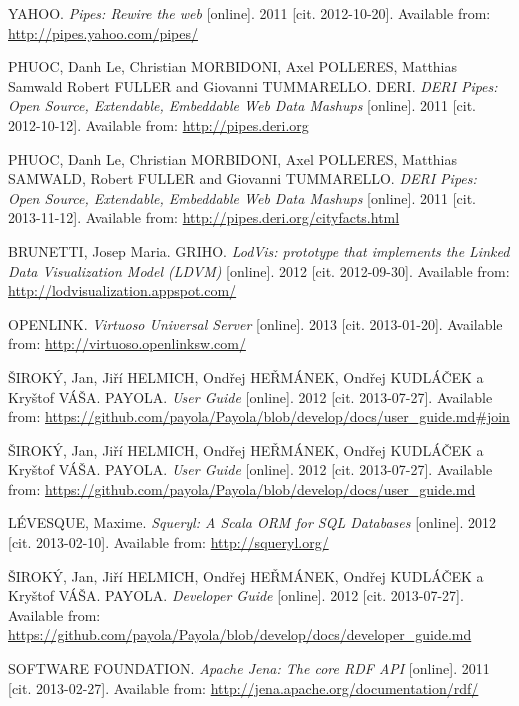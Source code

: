 \begin{thebibliography}{99}
{\sc YAHOO.}
\emph{Pipes: Rewire the web} [online]. 2011 [cit. 2012-10-20].
Available from: \url{http://pipes.yahoo.com/pipes/}

{\sc PHUOC,} Danh Le, Christian MORBIDONI, Axel POLLERES,
Matthias Samwald Robert FULLER and Giovanni TUMMARELLO. DERI.
\emph{DERI Pipes: Open Source, Extendable, Embeddable Web Data Mashups} [online].
2011 [cit. 2012-10-12]. 
Available from: \url{http://pipes.deri.org}

{\sc PHUOC,} Danh Le, Christian MORBIDONI, Axel POLLERES,
Matthias SAMWALD, Robert FULLER and Giovanni TUMMARELLO.
\emph{DERI Pipes: Open Source, Extendable, Embeddable Web Data Mashups} [online]. 2011
[cit. 2013-11-12].
Available from: \url{http://pipes.deri.org/cityfacts.html}

{\sc BRUNETTI,} Josep Maria. GRIHO.
\emph{LodVis: prototype that implements the Linked Data Visualization Model (LDVM)}
[online]. 2012 [cit. 2012-09-30].
Available from: \url{http://lodvisualization.appspot.com/}

{\sc OPENLINK.}
\emph{Virtuoso Universal Server} [online]. 2013 [cit. 2013-01-20].
Available from: \url{http://virtuoso.openlinksw.com/}

{\sc ŠIROKÝ,} Jan, Jiří HELMICH, Ondřej HEŘMÁNEK, Ondřej KUDLÁČEK a Kryštof VÁŠA. PAYOLA.
\emph{User Guide} [online]. 2012 [cit. 2013-07-27]. 
Available from: \url{https://github.com/payola/Payola/blob/develop/docs/user_guide.md#join}

{\sc ŠIROKÝ,} Jan, Jiří HELMICH, Ondřej HEŘMÁNEK, Ondřej KUDLÁČEK a Kryštof VÁŠA. PAYOLA.
\emph{User Guide} [online]. 2012 [cit. 2013-07-27]. 
Available from: \url{https://github.com/payola/Payola/blob/develop/docs/user_guide.md}

{\sc LÉVESQUE,} Maxime. 
\emph{Squeryl: A Scala ORM for SQL Databases} [online]. 2012 [cit. 2013-02-10].
Available from: \url{http://squeryl.org/}

{\sc ŠIROKÝ,} Jan, Jiří HELMICH, Ondřej HEŘMÁNEK, Ondřej KUDLÁČEK a Kryštof VÁŠA. PAYOLA.
\emph{Developer Guide} [online]. 2012 [cit. 2013-07-27]. 
Available from: \url{https://github.com/payola/Payola/blob/develop/docs/developer_guide.md}

{\scAPACHE SOFTWARE FOUNDATION.} 
\emph{Apache Jena: The core RDF API} [online]. 2011 [cit. 2013-02-27]. 
Available from: \url{http://jena.apache.org/documentation/rdf/}


\end{thebibliography}

